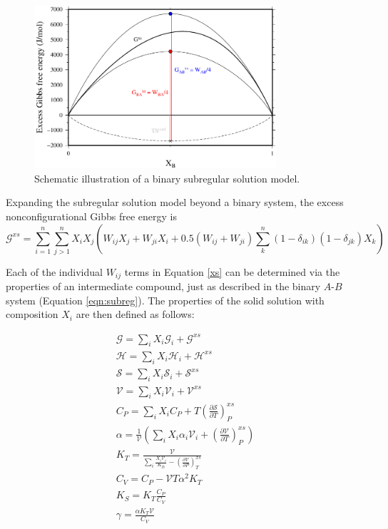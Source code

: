 \documentclass[review]{elsarticle}
\begin{document}
\begin{figure}[ht!]
  \centering
  \includegraphics[width=0.8\textwidth]{figures/schematic}
  \caption{Schematic illustration of a binary subregular solution model.}
  \label{fig:schematic}
\end{figure}


Expanding the subregular solution model beyond a binary system, the excess nonconfigurational Gibbs free energy is \citep{HW1989} 
\begin{equation}
  \mathcal{G}^{xs} = \sum_{i=1}^n \sum_{j>1}^n X_i X_j \left ( W_{ij} X_j + W_{ji} X_i + 0.5 (W_{ij} + W_{ji}) \sum_k^n (1-\delta_{ik})(1-\delta_{jk}) X_k \right)
  \label{xs}
\end{equation}

Each of the individual $W_{ij}$ terms in Equation \ref{xs} can be determined via the properties of an intermediate compound, just as described in the binary $A$-$B$ system (Equation \ref{eqn:subreg}). The properties of the solid solution with composition ${X_i}$ are then defined as follows:

\begin{eqnarray}
\mathcal{G} = \sum_i X_i \mathcal{G}_i + \mathcal{G}^{xs} \\
\mathcal{H} = \sum_i X_i \mathcal{H}_i + \mathcal{H}^{xs} \\
\mathcal{S} = \sum_i X_i \mathcal{S}_i + \mathcal{S}^{xs} \\
\mathcal{V} = \sum_i X_i \mathcal{V}_i + \mathcal{V}^{xs} \\
C_P = \sum_i X_i C_P  + T \left( \frac{\partial \mathcal{S}}{\partial T} \right)_P^{xs} \\
\alpha = \frac{1}{\mathcal{V}} \left ( \sum_i X_i \alpha_i \mathcal{V}_i + \left( \frac{\partial \mathcal{V}}{\partial T} \right)_P^{xs} \right) \label{alpha} \\
K_T = \frac{\mathcal{V}}{\sum_i \frac{X_i \mathcal{V}_i }{K_{Ti}} - \left( \frac{\partial \mathcal{V}}{\partial P} \right)_T^{xs} } \label{K_T} \\
C_V = C_P - \mathcal{V} T \alpha^2 K_T \\
K_S = K_T \frac{C_P}{C_V} \\
\gamma = \frac{\alpha K_T \mathcal{V}}{C_V}   
\end{eqnarray}
\end{document}
